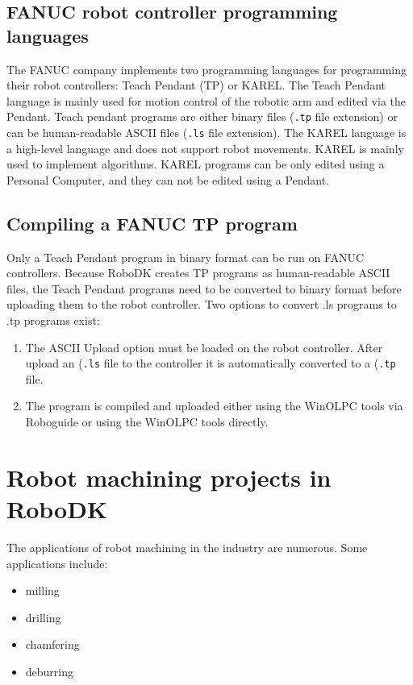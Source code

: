 \subsection{FANUC robot controller programming languages}

The FANUC company implements two programming languages for programming their robot controllers: Teach Pendant (TP) or KAREL. The Teach Pendant language is mainly used for motion control of the robotic arm and edited via the Pendant. Teach pendant programs are either binary files (\texttt{.tp} file extension) or can be human-readable ASCII files (\texttt{.ls} file extension). The KAREL language is a high-level language and does not support robot movements. KAREL is mainly used to implement algorithms. KAREL programs can be only edited using a Personal Computer, and they can not be edited using a Pendant.

\subsection{Compiling a FANUC TP program}

Only a Teach Pendant program in binary format can be run on FANUC controllers. Because RoboDK creates TP programs as human-readable ASCII files, the Teach Pendant programs need to be converted to binary format before uploading them to the robot controller. Two options to convert .ls programs to .tp programs exist:

\begin{enumerate}
\item The ASCII Upload option must be loaded on the robot controller. After upload an (\texttt{.ls} file to the controller it is automatically converted to a (\texttt{.tp} file.
\item The program is compiled and uploaded either using the WinOLPC  tools via Roboguide or using the WinOLPC tools directly.

\end{enumerate}

\section{Robot machining projects in RoboDK}

The applications of robot machining in the industry are numerous. Some applications include:

\begin{itemize}

    \item milling
    \item drilling
    \item chamfering
    \item deburring

\end{itemize}

